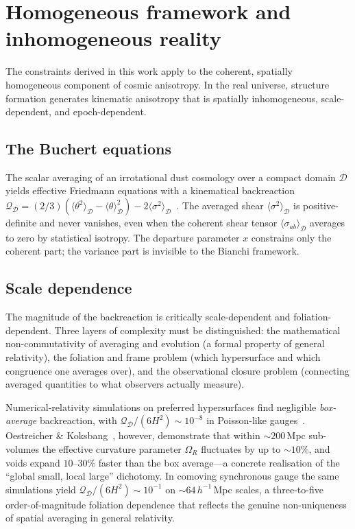 

\section{Homogeneous framework and inhomogeneous reality}
\label{sec:disc-backreaction}

The constraints derived in this work apply to the coherent,
spatially homogeneous component of cosmic anisotropy.  In the
real universe, structure formation generates kinematic
anisotropy that is spatially inhomogeneous, scale-dependent,
and epoch-dependent.


\subsection{The Buchert equations}
\label{sec:buchert-equations}

The scalar averaging of an irrotational dust cosmology over a
compact domain $\mathcal{D}$ yields effective Friedmann
equations with a kinematical backreaction
$\mathcal{Q}_\mathcal{D} = (2/3)
(\langle\theta^2\rangle_\mathcal{D}
- \langle\theta\rangle_\mathcal{D}^2)
- 2\langle\sigma^2\rangle_\mathcal{D}$~\cite{Buchert2000}.
The averaged shear
$\langle\sigma^2\rangle_\mathcal{D}$ is positive-definite and
never vanishes, even when the coherent shear tensor
$\langle\sigma_{ab}\rangle_\mathcal{D}$ averages to zero by
statistical isotropy.  The departure parameter $x$ constrains only
the coherent part; the variance part is invisible to the
Bianchi framework.


\subsection{Scale dependence}

The magnitude of the backreaction is critically
scale-dependent and foliation-dependent.  Three layers of
complexity must be distinguished: the mathematical
non-commutativity of averaging and evolution (a formal
property of general relativity), the foliation and frame
problem (which hypersurface and which congruence one
averages over), and the observational closure problem
(connecting averaged quantities to what observers actually
measure).

Numerical-relativity simulations on preferred hypersurfaces
find negligible \emph{box-average} backreaction, with
$\mathcal{Q}_\mathcal{D}/(6H^2) \sim 10^{-8}$ in
Poisson-like gauges~\cite{Aurrekoetxea2025}.
Oestreicher \& Koksbang~\cite{OestreicherKoksbang2024},
however, demonstrate that within $\sim\!200\,$Mpc sub-volumes
the effective curvature parameter $\Omega_R$ fluctuates by up
to $\sim\!10\%$, and voids expand $10$--$30\%$ faster than the
box average---a concrete realisation of the ``global small,
local large'' dichotomy.  In comoving synchronous gauge the
same simulations yield
$\mathcal{Q}_\mathcal{D}/(6H^2) \sim 10^{-1}$ on
$\sim 64\,h^{-1}\,$Mpc scales, a three-to-five order-of-magnitude
foliation dependence that reflects the genuine non-uniqueness
of spatial averaging in general relativity.

